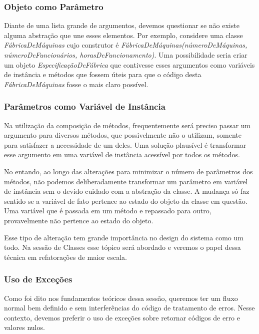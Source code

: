 


\subsubsection{Objeto como Parâmetro}
Diante de uma lista grande de argumentos, devemos questionar se não existe alguma abstração que une esses elementos. Por exemplo, considere uma classe \textit{FábricaDeMáquinas} cujo construtor é \textit{FábricaDeMáquinas(númeroDeMáquinas, númeroDeFuncionários, horasDeFuncionamento)}. Uma possibilidade seria criar um objeto \textit{EspecificaçãoDeFábrica} que contivesse esses argumentos como variáveis de instância e métodos que fossem úteis para que o código desta \textit{FábricaDeMáquinas} fosse o mais claro possível.

\subsubsection{Parâmetros como Variável de Instância}
\label{metodos:parametros}
Na utilização da composição de métodos, frequentemente será preciso passar um argumento para diversos métodos, que 
possivelmente não o utilizam, somente para satisfazer a necessidade de um deles. Uma solução plausível é transformar esse 
argumento em uma variável de instância acessível por todos os métodos.

No entando, ao longo das alterações para minimizar o número de parâmetros dos métodos, não podemos
deliberadamente transformar um parâmetro em variável de instância sem o devido cuidado
com a abstração da classe. A mudança só faz sentido se a variável de fato pertence ao 
estado do objeto da classe em questão. Uma variável que é passada em um método e repassado
para outro, provavelmente não pertence ao estado do objeto.

Esse tipo de alteração tem grande importância no design do sistema como um todo. Na sessão de Classes esse tópico será abordado e veremos o papel dessa técnica em refatorações de maior escala.

\subsubsection{Uso de Exceções}
Como foi dito nos fundamentos teóricos dessa sessão, queremos ter um fluxo normal bem definido e sem interferências do código de tratamento de erros. Nesse contexto, devemos preferir o uso de exceções sobre retornar códigos de erro e valores nulos.
	

